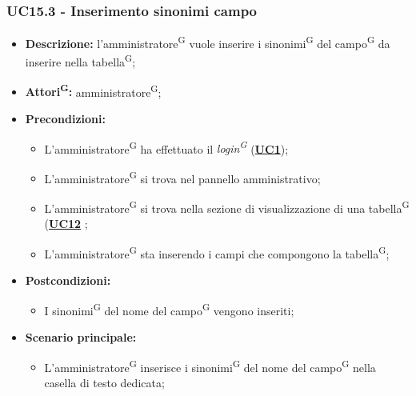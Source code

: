 \subsubsection{UC15.3 - Inserimento sinonimi campo}
\label{sec:UC15.3}
\begin{itemize}
	\item \textbf{Descrizione:} l’amministratore\textsuperscript{G} vuole inserire i sinonimi\textsuperscript{G} del campo\textsuperscript{G} da inserire nella tabella\textsuperscript{G};
	\item \textbf{Attori\textsuperscript{G}:} amministratore\textsuperscript{G};
	\item \textbf{Precondizioni:} 
	\begin{itemize}
		\item L’amministratore\textsuperscript{G} ha effettuato il \textit{login\textsuperscript{G}} (\hyperref[sec:UC1]{\textbf{UC1}});
		\item L’amministratore\textsuperscript{G} si trova nel pannello amministrativo;
		\item L’amministratore\textsuperscript{G} si trova nella sezione di visualizzazione di una tabella\textsuperscript{G} (\hyperref[sec:UC12]{\textbf{UC12}} ;
		\item L’amministratore\textsuperscript{G} sta inserendo i campi che compongono la tabella\textsuperscript{G};
	\end{itemize}
	\item \textbf{Postcondizioni:} 
	\begin{itemize}
		\item I sinonimi\textsuperscript{G} del nome del campo\textsuperscript{G} vengono inseriti;
	\end{itemize}
	\item \textbf{Scenario principale:} 
	\begin{itemize}
		\item L’amministratore\textsuperscript{G} inserisce i sinonimi\textsuperscript{G} del nome del campo\textsuperscript{G} nella casella di testo dedicata;
	\end{itemize}
\end{itemize}

